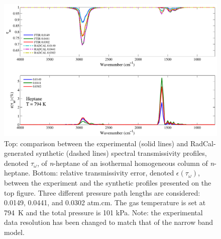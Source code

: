 \begin{figure}[p]
\includegraphics[width=\textwidth]{../Verification/Results_Test2/Heptane_794.pdf}
\caption{Top: comparison between the experimental (solid lines) and RadCal-generated synthetic (dashed lines) spectral transmissivity profiles, denoted $\tau_{\omega}$, of \textit{n}-heptane of an isothermal homogeneous column of \textit{n}-heptane. Bottom: relative transmissivity error, denoted $\epsilon{(\tau_{\omega})}$, between the experiment and the synthetic profiles presented on the top figure. Three different pressure path lengths are considered: 0.0149, 0.0441, and 0.0302 atm.cm. The gas temperature is set at 794~K and the total pressure is 101 kPa. Note: the experimental data resolution has been changed to match that of the narrow band model. \label{fig:nheptane_Verify_794K}}
\end{figure}


